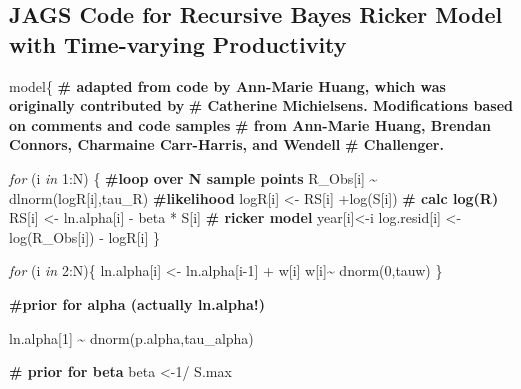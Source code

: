\documentclass[french,11pt]{book}
\newenvironment{Shaded}{\begin{snugshade}}{\end{snugshade}}
\newcommand{\CommentTok}[1]{\textcolor[rgb]{0.56,0.35,0.01}{\textbf{#1}}}
\newcommand{\ControlFlowTok}[1]{\textcolor[rgb]{0.13,0.29,0.53}{\textit{#1}}}
\newcommand{\DecValTok}[1]{\textcolor[rgb]{0.00,0.00,0.81}{#1}}
\newcommand{\FunctionTok}[1]{\textcolor[rgb]{0.00,0.00,0.00}{#1}}
\newcommand{\NormalTok}[1]{#1}
\newcommand{\OtherTok}[1]{\textcolor[rgb]{0.56,0.35,0.01}{#1}}
\newcommand{\SpecialCharTok}[1]{\textcolor[rgb]{0.00,0.00,0.00}{#1}}
\begin{document}
\subsection{JAGS Code for Recursive Bayes Ricker Model with Time-varying Productivity}\label{jags-code-for-recursive-bayes-ricker-model-with-time-varying-productivity}
\begin{Shaded}
\begin{Highlighting}[]
\NormalTok{model\{}
    \CommentTok{\# adapted from code by Ann{-}Marie Huang, which was originally contributed by }
    \CommentTok{\# Catherine Michielsens. Modifications based on comments and code samples }
    \CommentTok{\# from Ann{-}Marie Huang, Brendan Connors, Charmaine Carr{-}Harris, and Wendell }
    \CommentTok{\# Challenger.}

    \ControlFlowTok{for}\NormalTok{ (i }\ControlFlowTok{in} \DecValTok{1}\SpecialCharTok{:}\NormalTok{N) \{       }\CommentTok{\#loop over N sample points}
\NormalTok{      R\_Obs[i] }\SpecialCharTok{\textasciitilde{}} \FunctionTok{dlnorm}\NormalTok{(logR[i],tau\_R)       }\CommentTok{\#likelihood }
\NormalTok{      logR[i] }\OtherTok{\textless{}{-}}\NormalTok{ RS[i] }\SpecialCharTok{+}\FunctionTok{log}\NormalTok{(S[i])            }\CommentTok{\# calc log(R) }
\NormalTok{      RS[i] }\OtherTok{\textless{}{-}}\NormalTok{ ln.alpha[i] }\SpecialCharTok{{-}}\NormalTok{ beta }\SpecialCharTok{*}\NormalTok{ S[i]     }\CommentTok{\# ricker model}
\NormalTok{      year[i]}\OtherTok{\textless{}{-}}\NormalTok{i}
\NormalTok{      log.resid[i] }\OtherTok{\textless{}{-}}  \FunctionTok{log}\NormalTok{(R\_Obs[i]) }\SpecialCharTok{{-}}\NormalTok{ logR[i]  }
\NormalTok{    \}}

    \ControlFlowTok{for}\NormalTok{ (i }\ControlFlowTok{in} \DecValTok{2}\SpecialCharTok{:}\NormalTok{N)\{}
\NormalTok{          ln.alpha[i] }\OtherTok{\textless{}{-}}\NormalTok{ ln.alpha[i}\DecValTok{{-}1}\NormalTok{] }\SpecialCharTok{+}\NormalTok{ w[i]}
\NormalTok{          w[i]}\SpecialCharTok{\textasciitilde{}} \FunctionTok{dnorm}\NormalTok{(}\DecValTok{0}\NormalTok{,tauw)}
\NormalTok{    \}}

    \CommentTok{\#prior for alpha (actually ln.alpha!)}
    
\NormalTok{    ln.alpha[}\DecValTok{1}\NormalTok{] }\SpecialCharTok{\textasciitilde{}} \FunctionTok{dnorm}\NormalTok{(p.alpha,tau\_alpha)    }
    
    \CommentTok{\# prior for beta}
\NormalTok{    beta }\OtherTok{\textless{}{-}}\DecValTok{1}\SpecialCharTok{/}\NormalTok{ S.max                    }
    

\end{Highlighting}
\end{Shaded}
\end{document}
